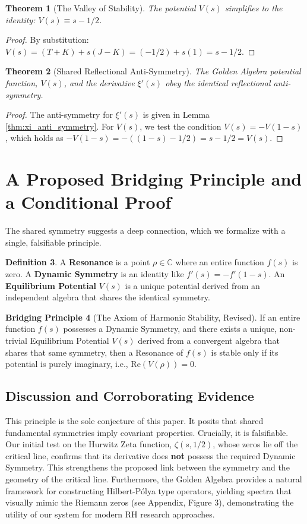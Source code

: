 \documentclass{article}
\theoremstyle{plain}
\newtheorem{theorem}{Theorem}[section]
\theoremstyle{definition}
\newtheorem{definition}[theorem]{Definition}
\newtheorem{conjecture}[theorem]{Bridging Principle}
\theoremstyle{remark}
\begin{document}
\begin{theorem}[The Valley of Stability]
The potential $V(s)$ simplifies to the identity: $V(s) \equiv s - 1/2$.
\end{theorem}
\begin{proof}
By substitution: $V(s) = (T+K) + s(J-K) = (-1/2) + s(1) = s - 1/2$.
\end{proof}

\begin{theorem}[Shared Reflectional Anti-Symmetry]
The Golden Algebra potential function, $V(s)$, and the derivative $\xi'(s)$ obey the identical reflectional anti-symmetry.
\end{theorem}
\begin{proof}
The anti-symmetry for $\xi'(s)$ is given in Lemma \ref{thm:xi_anti_symmetry}. For $V(s)$, we test the condition $V(s) = -V(1-s)$, which holds as $-V(1-s) = -((1-s) - 1/2) = s - 1/2 = V(s)$.
\end{proof}

\section{A Proposed Bridging Principle and a Conditional Proof}
The shared symmetry suggests a deep connection, which we formalize with a single, falsifiable principle.

\begin{definition}
A \textbf{Resonance} is a point $\rho \in \mathbb{C}$ where an entire function $f(s)$ is zero. A \textbf{Dynamic Symmetry} is an identity like $f'(s) = -f'(1-s)$. An \textbf{Equilibrium Potential} $V(s)$ is a unique potential derived from an independent algebra that shares the identical symmetry.
\end{definition}

\begin{conjecture}[The Axiom of Harmonic Stability, Revised]
\label{conj:stability}
If an entire function $f(s)$ possesses a Dynamic Symmetry, and there exists a unique, non-trivial Equilibrium Potential $V(s)$ derived from a convergent algebra that shares that same symmetry, then a Resonance of $f(s)$ is stable only if its potential is purely imaginary, i.e., $\mathrm{Re}(V(\rho))=0$.
\end{conjecture}

\subsection{Discussion and Corroborating Evidence}
This principle is the sole conjecture of this paper. It posits that shared fundamental symmetries imply covariant properties. Crucially, it is falsifiable. Our initial test on the Hurwitz Zeta function, $\zeta(s, 1/2)$, whose zeros lie off the critical line, confirms that its derivative does \textbf{not} possess the required Dynamic Symmetry. This strengthens the proposed link between the symmetry and the geometry of the critical line. Furthermore, the Golden Algebra provides a natural framework for constructing Hilbert-Pólya type operators, yielding spectra that visually mimic the Riemann zeros (see Appendix, Figure 3), demonstrating the utility of our system for modern RH research approaches.
\end{document}
